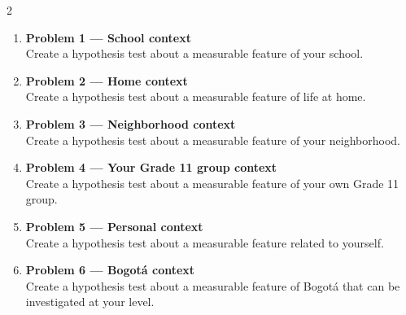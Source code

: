 \documentclass[12pt]{article}
\begin{document}
\begin{multicols}{2}
	\begin{enumerate}
		\item \textbf{Problem 1 --- School context}\\
		Create a hypothesis test about a measurable feature of your school.
		
		\item \textbf{Problem 2 --- Home context}\\
		Create a hypothesis test about a measurable feature of life at home.
		
		\item \textbf{Problem 3 --- Neighborhood context}\\
		Create a hypothesis test about a measurable feature of your neighborhood.
		
		\item \textbf{Problem 4 --- Your Grade 11 group context}\\
		Create a hypothesis test about a measurable feature of your own Grade 11 group.
		
		\item \textbf{Problem 5 --- Personal context}\\
		Create a hypothesis test about a measurable feature related to yourself.
		
		\item \textbf{Problem 6 --- Bogotá context}\\
		Create a hypothesis test about a measurable feature of Bogotá that can be investigated at your level.
	\end{enumerate}
	
\end{multicols}
\end{document}
